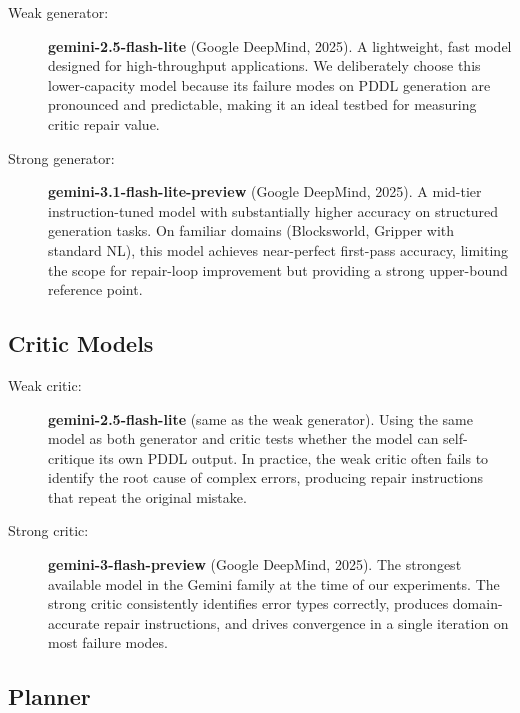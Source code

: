 \documentclass{article}
\begin{document}
\begin{description}
  \item[Weak generator:] \textbf{gemini-2.5-flash-lite} (Google DeepMind, 2025).
        A lightweight, fast model designed for high-throughput applications.
        We deliberately choose this lower-capacity model because its failure modes
        on PDDL generation are pronounced and predictable, making it an ideal
        testbed for measuring critic repair value.

  \item[Strong generator:] \textbf{gemini-3.1-flash-lite-preview} (Google DeepMind, 2025).
        A mid-tier instruction-tuned model with substantially higher accuracy on
        structured generation tasks.  On familiar domains (Blocksworld, Gripper
        with standard NL), this model achieves near-perfect first-pass accuracy,
        limiting the scope for repair-loop improvement but providing a strong
        upper-bound reference point.
\end{description}

\subsection{Critic Models}
\label{sec:critic_models}

\begin{description}
  \item[Weak critic:] \textbf{gemini-2.5-flash-lite} (same as the weak generator).
        Using the same model as both generator and critic tests whether the model
        can self-critique its own PDDL output.  In practice, the weak critic often
        fails to identify the root cause of complex errors, producing repair
        instructions that repeat the original mistake.

  \item[Strong critic:] \textbf{gemini-3-flash-preview} (Google DeepMind, 2025).
        The strongest available model in the Gemini family at the time of our experiments.
        The strong critic consistently identifies error types correctly, produces
        domain-accurate repair instructions, and drives convergence in a single
        iteration on most failure modes.
\end{description}

\subsection{Planner}
\label{sec:planner}
\end{document}
